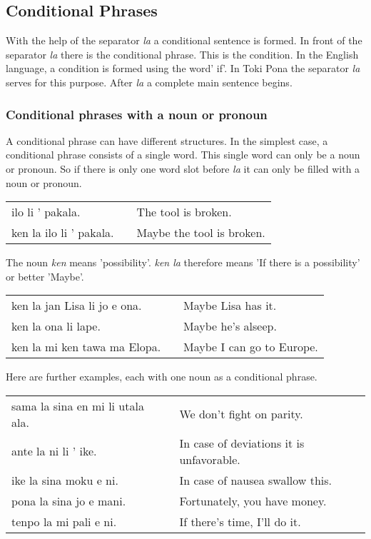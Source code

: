 \subsection*{Conditional Phrases}
%
%
With the help of the separator \textit{la} a conditional sentence is formed.
In front of the separator \textit{la} there is the conditional phrase. 
This is the condition. 
In the English language, a condition is formed using the word' if'.
In Toki Pona the separator \textit{la} serves for this purpose. 
After \textit{la} a complete main sentence begins.

%
\subsubsection*{Conditional phrases with a noun or pronoun}
%
%
A conditional phrase can have different structures. 
In the simplest case, a conditional phrase consists of a single word. 
This single word can only be a noun or pronoun. 
So if there is only one word slot before \textit{la} it can only be filled with a noun or pronoun. 

\begin{supertabular}{p{5,5cm}|ll}
ilo li ' pakala. && The tool is broken. \\
ken la ilo li ' pakala. && Maybe the tool is broken. \\
\end{supertabular} 

The noun \textit{ken} means 'possibility'.
\textit{ken la} therefore means 'If there is a possibility' or better 'Maybe'.

\begin{supertabular}{p{5,5cm}|ll}
ken la jan Lisa li jo e ona. && Maybe Lisa has it. \\
ken la ona li lape. && Maybe he's alseep. \\
ken la mi ken tawa ma Elopa. && Maybe I can go to Europe. \\
\end{supertabular} 

Here are further examples, each with one noun as a conditional phrase.

\begin{supertabular}{p{5,5cm}|ll}
sama la sina en mi li utala ala. && We don't fight on parity. \\
ante la ni li ' ike. && In case of deviations it is unfavorable. \\
ike la sina moku e ni. && In case of nausea swallow this. \\
pona la sina jo e mani. && Fortunately, you have money. \\
tenpo la mi pali e ni. && If there's time, I'll do it. \\



\end{supertabular} 

